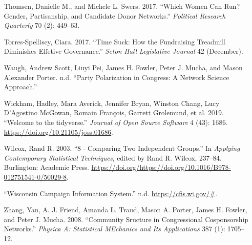\documentclass[12pt,]{article}
\begin{document}
\leavevmode\hypertarget{ref-thomsen2017}{}%
Thomsen, Danielle M., and Michele L. Swers. 2017. ``Which Women Can Run?
Gender, Partisanship, and Candidate Donor Networks.'' \emph{Political
Research Quarterly} 70 (2): 449--63.

\leavevmode\hypertarget{ref-torres-spelliscy2017}{}%
Torres-Spelliscy, Ciara. 2017. ``Time Suck: How the Fundraising
Treadmill Diminishes Effetive Governance.'' \emph{Seton Hall Legislative
Journal} 42 (December).

\leavevmode\hypertarget{ref-waugh2009}{}%
Waugh, Andrew Scott, Liuyi Pei, James H. Fowler, Peter J. Mucha, and
Mason Alexander Porter. n.d. ``Party Polarization in Congress: A Network
Science Approach.''

\leavevmode\hypertarget{ref-tidyverse}{}%
Wickham, Hadley, Mara Averick, Jennifer Bryan, Winston Chang, Lucy
D'Agostino McGowan, Romain François, Garrett Grolemund, et al. 2019.
``Welcome to the tidyverse.'' \emph{Journal of Open Source Software} 4
(43): 1686. \url{https://doi.org/10.21105/joss.01686}.

\leavevmode\hypertarget{ref-wilcox2003}{}%
Wilcox, Rand R. 2003. ``8 - Comparing Two Independent Groups.'' In
\emph{Applying Contemporary Statistical Techniques}, edited by Rand R.
Wilcox, 237--84. Burlington: Academic Press.
\url{https://doi.org/https://doi.org/10.1016/B978-012751541-0/50029-8}.

\leavevmode\hypertarget{ref-cfis}{}%
``Wisconsin Campaign Information System.'' n.d.
\url{https://cfis.wi.gov/\#}.

\leavevmode\hypertarget{ref-zhang2008}{}%
Zhang, Yan, A. J. Friend, Amanda L. Traud, Mason A. Porter, James H.
Fowler, and Peter J. Mucha. 2008. ``Community Sructure in Congressional
Cosponsorship Networks.'' \emph{Physica A: Statistical MEchanics and Its
Applications} 387 (1): 1705--12.





\newpage
\singlespacing 
\end{document}
